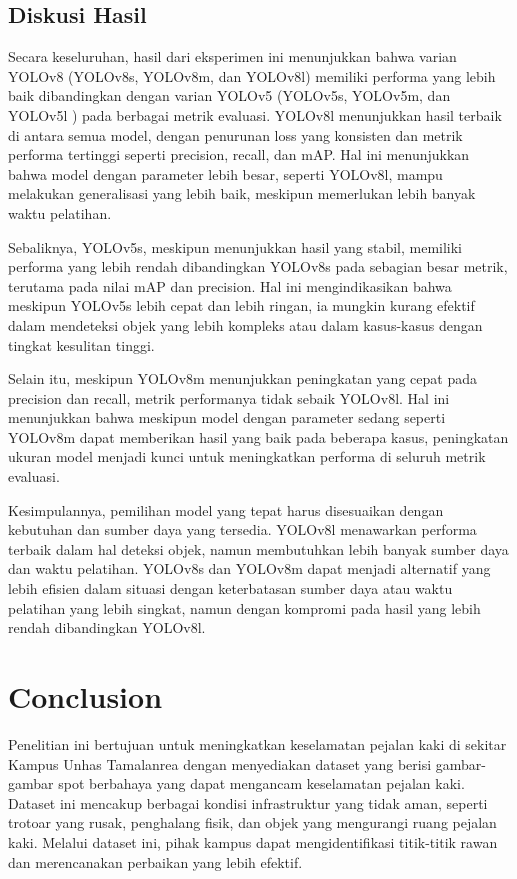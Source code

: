 \documentclass[12pt,a4paper]{article}
\begin{document}
\subsection{Diskusi Hasil}

Secara keseluruhan, hasil dari eksperimen ini menunjukkan bahwa varian YOLOv8 (YOLOv8s, YOLOv8m, dan YOLOv8l) memiliki performa yang lebih baik dibandingkan dengan varian YOLOv5 (YOLOv5s, YOLOv5m, dan YOLOv5l ) pada berbagai metrik evaluasi. YOLOv8l menunjukkan hasil terbaik di antara semua model, dengan penurunan loss yang konsisten dan metrik performa tertinggi seperti precision, recall, dan mAP. Hal ini menunjukkan bahwa model dengan parameter lebih besar, seperti YOLOv8l, mampu melakukan generalisasi yang lebih baik, meskipun memerlukan lebih banyak waktu pelatihan.

Sebaliknya, YOLOv5s, meskipun menunjukkan hasil yang stabil, memiliki performa yang lebih rendah dibandingkan YOLOv8s pada sebagian besar metrik, terutama pada nilai mAP dan precision. Hal ini mengindikasikan bahwa meskipun YOLOv5s lebih cepat dan lebih ringan, ia mungkin kurang efektif dalam mendeteksi objek yang lebih kompleks atau dalam kasus-kasus dengan tingkat kesulitan tinggi.

Selain itu, meskipun YOLOv8m menunjukkan peningkatan yang cepat pada precision dan recall, metrik performanya tidak sebaik YOLOv8l. Hal ini menunjukkan bahwa meskipun model dengan parameter sedang seperti YOLOv8m dapat memberikan hasil yang baik pada beberapa kasus, peningkatan ukuran model menjadi kunci untuk meningkatkan performa di seluruh metrik evaluasi.

Kesimpulannya, pemilihan model yang tepat harus disesuaikan dengan kebutuhan dan sumber daya yang tersedia. YOLOv8l menawarkan performa terbaik dalam hal deteksi objek, namun membutuhkan lebih banyak sumber daya dan waktu pelatihan. YOLOv8s dan YOLOv8m dapat menjadi alternatif yang lebih efisien dalam situasi dengan keterbatasan sumber daya atau waktu pelatihan yang lebih singkat, namun dengan kompromi pada hasil yang lebih rendah dibandingkan YOLOv8l.


\newpage
\section{Conclusion}

Penelitian ini bertujuan untuk meningkatkan keselamatan pejalan kaki di sekitar Kampus Unhas Tamalanrea dengan menyediakan dataset yang berisi gambar-gambar spot berbahaya yang dapat mengancam keselamatan pejalan kaki. Dataset ini mencakup berbagai kondisi infrastruktur yang tidak aman, seperti trotoar yang rusak, penghalang fisik, dan objek yang mengurangi ruang pejalan kaki. Melalui dataset ini, pihak kampus dapat mengidentifikasi titik-titik rawan dan merencanakan perbaikan yang lebih efektif.
\end{document}

